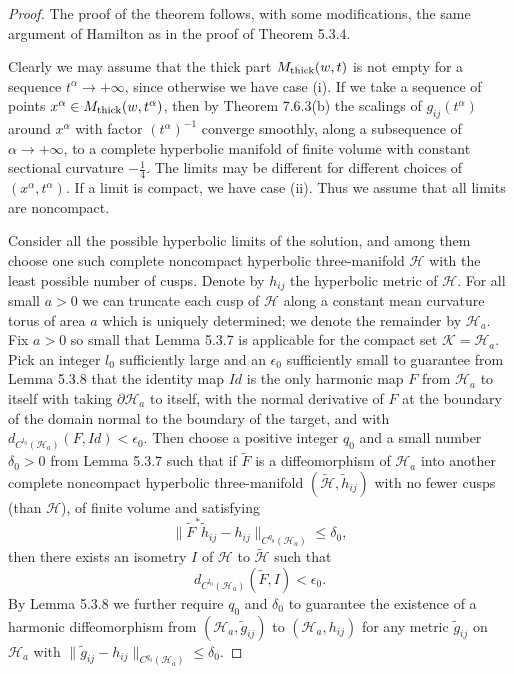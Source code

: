 \begin{proof}
The proof of the theorem follows, with some modifications, the
same argument of Hamilton \cite{Ha99} as in the proof of Theorem
5.3.4.

Clearly we may assume that the thick part $M_{\rm thick}(w,t)$ is
not empty for a sequence $t^{\alpha}\rightarrow+\infty$, since
otherwise we have case (i). If we take a sequence of points
$x^{\alpha}\in M_{\rm thick}(w,t^{\alpha})$, then by Theorem
7.6.3(b) the scalings of $g_{ij}(t^{\alpha})$ around $x^{\alpha}$
with factor $(t^{\alpha})^{-1}$ converge smoothly, along a
subsequence of $\alpha\rightarrow+\infty$, to a complete
hyperbolic manifold of finite volume with constant sectional
curvature $-\frac{1}{4}$. The limits may be different for
different choices of $(x^{\alpha},t^{\alpha})$. If a limit is
compact, we have case (ii). Thus we assume that all limits are
noncompact.

Consider all the possible hyperbolic limits of the solution, and
among them choose one such complete noncompact hyperbolic
three-manifold $\mathcal{H}$ with the least possible number of
cusps. Denote by $h_{ij}$ the hyperbolic metric of $\mathcal{H}$.
For all small $a>0$ we can truncate each cusp of $\mathcal{H}$
along a constant mean curvature torus of area $a$ which is
uniquely determined; we denote the remainder by $\mathcal{H}_a$.
Fix $a>0$ so small that Lemma 5.3.7 is applicable for the compact
set $\mathcal{K}=\mathcal{H}_a$. Pick an integer $l_0$
sufficiently large and an $\epsilon_0$ sufficiently small to
guarantee from Lemma 5.3.8 that the identity map $Id$ is the only
harmonic map $F$ from $\mathcal{H}_a$ to itself with taking
$\partial \mathcal{H}_a$ to itself, with the normal derivative of
$F$ at the boundary of the domain normal to the boundary of the
target, and with $d_{C^{l_0}(\mathcal{H}_a)}(F,Id) < \epsilon_0$.
Then choose a positive integer $q_0$ and a small number
$\delta_0>0$ from Lemma 5.3.7 such that if $\widetilde{F}$ is a
diffeomorphism of $\mathcal{H}_a$ into another complete noncompact
hyperbolic three-manifold
$(\widetilde{\mathcal{H}},\widetilde{h}_{ij})$ with no fewer cusps
(than $\mathcal{H}$), of finite volume and satisfying
$$
\|\widetilde{F}^*\widetilde{h}_{ij}-h_{ij}\|_{C^{q_0}
(\mathcal{H}_a)}\leq\delta_0,
$$
then there exists an isometry $I$ of $\mathcal{H}$ to
$\widetilde{\mathcal{H}}$ such that
$$
d_{C^{l_0}(\mathcal{H}_a)}(\widetilde{F},I)<\epsilon_0.
$$
By Lemma 5.3.8 we further require $q_0$ and $\delta_0$ to
guarantee the existence of a harmonic diffeomorphism from
$(\mathcal{H}_a,\widetilde{g}_{ij})$ to $(\mathcal{H}_a,h_{ij})$
for any metric $\widetilde{g}_{ij}$ on $\mathcal{H}_a$ with
$\|\widetilde{g}_{ij}-h_{ij}\|_{C^{q_0}(\mathcal{H}_a)}\leq
\delta_0$.


\end{proof}
